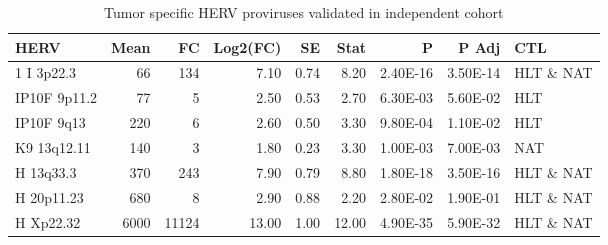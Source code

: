 \begin{table}[ht]
\centering
\caption{Tumor specific HERV proviruses validated in independent cohort} 
\label{tab:val}
\begingroup\small
\begin{tabular}{lrrrrrrrl}
 {\textbf{HERV}} & {\textbf{Mean}} & {\textbf{FC}} & {\textbf{Log2(FC)}} & {\textbf{SE}} & {\textbf{Stat}} & {\textbf{P}} & {\textbf{P Adj}} & {\textbf{CTL}} \\ 
  \hline
1 I 3p22.3 & 66 & 134 & 7.10 & 0.74 & 8.20 & 2.40E-16 & 3.50E-14 & HLT \& NAT \\ 
  IP10F 9p11.2 & 77 & 5 & 2.50 & 0.53 & 2.70 & 6.30E-03 & 5.60E-02 & HLT \\ 
  IP10F 9q13 & 220 & 6 & 2.60 & 0.50 & 3.30 & 9.80E-04 & 1.10E-02 & HLT \\ 
  K9 13q12.11 & 140 & 3 & 1.80 & 0.23 & 3.30 & 1.00E-03 & 7.00E-03 & NAT \\ 
  H 13q33.3 & 370 & 243 & 7.90 & 0.79 & 8.80 & 1.80E-18 & 3.50E-16 & HLT \& NAT \\ 
  H 20p11.23 & 680 & 8 & 2.90 & 0.88 & 2.20 & 2.80E-02 & 1.90E-01 & HLT \& NAT \\ 
  H Xp22.32 & 6000 & 11124 & 13.00 & 1.00 & 12.00 & 4.90E-35 & 5.90E-32 & HLT \& NAT \\ 
   \hline
\end{tabular}
\endgroup
\end{table}
